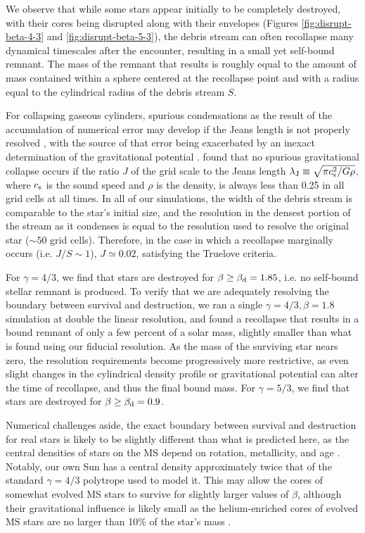 \documentclass[twocolumn]{emulateapj}
\begin{document}
We observe that while some stars appear initially to be completely destroyed, with their cores being disrupted along with their envelopes (Figures \ref{fig:disrupt-beta-4-3} and \ref{fig:disrupt-beta-5-3}), the debris stream can often recollapse many dynamical timescales after the encounter, resulting in a small yet self-bound remnant. The mass of the remnant that results is roughly equal to the amount of mass contained within a sphere centered at the recollapse point and with a radius equal to the cylindrical radius of the debris stream $S$.

For collapsing gaseous cylinders, spurious condensations as the result of the accumulation of numerical error may develop if the Jeans length is not properly resolved \citep{Truelove:1997bj}, with the source of that error being exacerbated by an inexact determination of the gravitational potential \citep{Jiang:2013ii}. \citeauthor{Truelove:1997bj} found that no spurious gravitational collapse occurs if the ratio $J$ of the grid scale to the Jeans length $\lambda_{\rm J} \equiv \sqrt{\pi c_{\rm s}^{2}/G\rho}$, where $c_{\rm s}$ is the sound speed and $\rho$ is the density, is always less than 0.25 in all grid cells at all times. In all of our simulations, the width of the debris stream is comparable to the star's initial size, and the resolution in the densest portion of the stream as it condenses is equal to the resolution used to resolve the original star ($\sim 50$ grid cells). Therefore, in the case in which a recollapse marginally occurs (i.e. $J/S \sim 1$), $J \simeq 0.02$, satisfying the Truelove criteria.

For $\gamma = 4/3$, we find that stars are destroyed for $\beta \geq \beta_{\rm d} = 1.85$, i.e. no self-bound stellar remnant is produced. To verify that we are adequately resolving the boundary between survival and destruction, we ran a single $\gamma = 4/3, \beta = 1.8$ simulation at double the linear resolution, and found a recollapse that results in a bound remnant of only a few percent of a solar mass, slightly smaller than what is found using our fiducial resolution. As the mass of the surviving star nears zero, the resolution requirements become progressively more restrictive, as even slight changes in the cylindrical density profile or gravitational potential can alter the time of recollapse, and thus the final bound mass. For $\gamma = 5/3$, we find that stars are destroyed for $\beta \geq \beta_{\rm d} = 0.9$.

Numerical challenges aside, the exact boundary between survival and destruction for real stars is likely to be slightly different than what is predicted here, as the central densities of stars on the MS depend on rotation, metallicity, and age \citep{Maeder:1974te,Wagner:1974fy}. Notably, our own Sun has a central density approximately twice that of the standard $\gamma = 4/3$ polytrope used to model it. This may allow the cores of somewhat evolved MS stars to survive for slightly larger values of $\beta$, although their gravitational influence is likely small as the helium-enriched cores of evolved MS stars are no larger than 10\% of the star's mass \citep{Schonberg:1942hh}.
\end{document}

